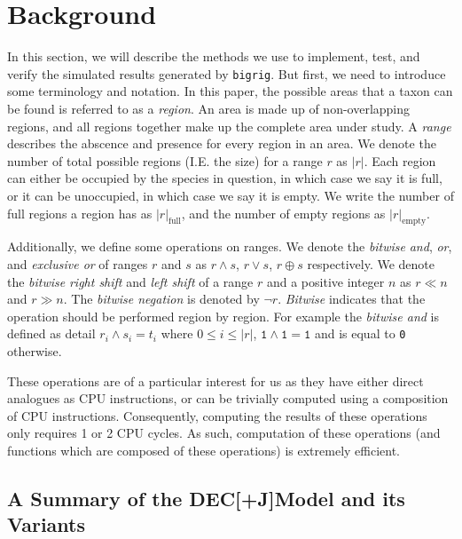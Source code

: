 \documentclass{article}
\newcommand{\CountFull}[1]{|#1|_\text{full}}
\newcommand{\CountEmpty}[1]{|#1|_\text{empty}}
\newcommand{\bigrig}{\texttt{bigrig}}
\newcommand{\decj}{DEC[+J]}
\newcommand{\rand}[2]{#1 \land #2}
\newcommand{\ror}[2]{#1 \lor #2}
\newcommand{\rneg}[1]{\neg #1}
\newcommand{\rxor}[2]{#1 \oplus #2}
\newcommand{\rLshift}[2]{#1 \ll #2}
\newcommand{\rRshift}[2]{#1 \gg #2}
\begin{document}
\section{Background}

In this section, we will describe the methods we use to implement, test, and verify the simulated results generated by
\bigrig{}.
But first, we need to introduce some terminology and notation.
In this paper, the possible areas that a taxon can be found is referred to as a \textit{region}.
An area is made up of non-overlapping regions, and all regions together make up the complete area under study.
A \textit{range} describes the abscence and presence for every region in an area.
We denote the number of total possible regions (I.E. the size) for a range \( r \) as \( |r| \).
Each region can either be occupied by the species in question, in which case we say it is full, or it can be unoccupied,
in which case we say it is empty.
We write the number of full regions a region has as \( \CountFull{r} \), and the number of empty regions as \(
\CountEmpty{r} \).

Additionally, we define some operations on ranges.
We denote the \textit{bitwise} \textit{and}, \textit{or}, and \textit{exclusive or} of ranges $r$ and $s$ as
$\rand{r}{s}$, $\ror{r}{s}$, $\rxor{r}{s}$ respectively.
We denote the \textit{bitwise} \textit{right shift} and \textit{left shift} of a range $r$ and a positive integer $n$ as
$\rLshift{r}{n}$ and $\rRshift{r}{n}$\footnotemark.
The \textit{bitwise negation} is denoted by $\rneg{r}$.
\textit{Bitwise} indicates that the operation should be performed region by region. For example the \textit{bitwise and}
is defined as detail $r_i \land s_i = t_i$ where $0 \leq i \leq |r|$, $\texttt{1} \land \texttt{1} = \texttt{1}$ and is
equal to \texttt{0} otherwise.


These operations are of a particular interest for us as they have either direct
analogues as CPU instructions, or can be trivially computed using a composition
of CPU instructions.
Consequently, computing the results of these operations only requires 1 or 2 CPU
cycles. 
As such, computation of these operations (and functions which are composed of
these operations) is extremely efficient.

\subsection{A Summary of the \decj Model and its Variants} \label{sec:model}
\end{document}
